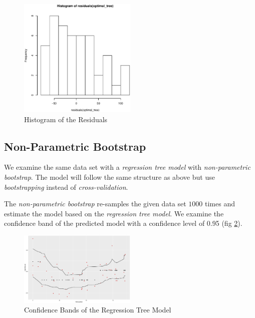 \documentclass[a4paper, twocolumn]{article}
\begin{document}
        \begin{figure}[h!]
            \centering
            \caption{Histogram of the Residuals}
            \label{fig:residuals}
            \includegraphics[width=0.5\textwidth]{share/A1_historgram_residuals.eps}
        \end{figure}

    \subsection*{Non-Parametric Bootstrap}

        We examine the same data set with a \emph{regression tree model} with \emph{non-parametric bootstrap}. The model will follow the same structure as above but use \emph{bootstrapping} instead of \emph{cross-validation}.

        The \emph{non-parametric bootstrap} re-samples the given data set $1000$ times and estimate the model based on the \emph{regression tree model}. We examine the confidence band of the predicted model with a confidence level of 0.95 (fig \ref{fig:confidence_bands}).

        \begin{figure}[h!]
            \centering
            \caption{Confidence Bands of the Regression Tree Model}
            \label{fig:confidence_bands}
            \includegraphics[width=0.5\textwidth]{share/A1_nonparametric.eps}
        \end{figure}
\end{document}
